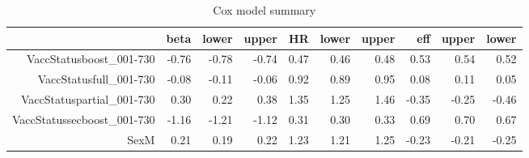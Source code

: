 \begin{table}[ht]
\centering
\begin{tabular}{rrrrrrrrrr}
  \hline
 & beta & lower & upper & HR & lower & upper & eff & upper & lower \\ 
  \hline
VaccStatusboost\_001-730 & -0.76 & -0.78 & -0.74 & 0.47 & 0.46 & 0.48 & 0.53 & 0.54 & 0.52 \\ 
  VaccStatusfull\_001-730 & -0.08 & -0.11 & -0.06 & 0.92 & 0.89 & 0.95 & 0.08 & 0.11 & 0.05 \\ 
  VaccStatuspartial\_001-730 & 0.30 & 0.22 & 0.38 & 1.35 & 1.25 & 1.46 & -0.35 & -0.25 & -0.46 \\ 
  VaccStatussecboost\_001-730 & -1.16 & -1.21 & -1.12 & 0.31 & 0.30 & 0.33 & 0.69 & 0.70 & 0.67 \\ 
  SexM & 0.21 & 0.19 & 0.22 & 1.23 & 1.21 & 1.25 & -0.23 & -0.21 & -0.25 \\ 
   \hline
\end{tabular}
\caption{Cox model summary} 
\end{table}
